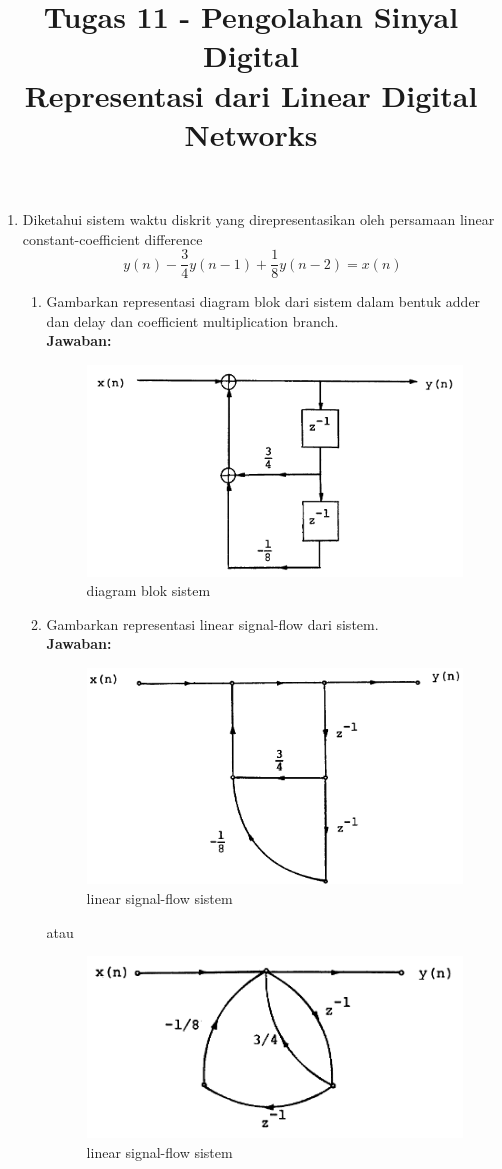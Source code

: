 \documentclass[12pt,a4paper]{article}
\title{Tugas 11 - Pengolahan Sinyal Digital\\
	Representasi dari Linear Digital Networks}
\date{}
\begin{document}
	\maketitle
	\date{}
	\begin{enumerate}
		\item Diketahui sistem waktu diskrit yang direpresentasikan oleh persamaan linear constant-coefficient difference \[ y(n) - \frac{3}{4} y(n-1) + \frac{1}{8} y(n-2) = x(n) \]
		\begin{enumerate}
			\item Gambarkan representasi diagram blok dari sistem dalam bentuk adder dan delay dan coefficient multiplication branch.\\
			\textbf{Jawaban:}\\
			
			\begin{figure}[H]
				\centering
				\includegraphics[width=0.5\linewidth]{img/img01}
				\caption{diagram blok sistem}
				\label{fig:img01}
			\end{figure}
			
			\item Gambarkan representasi linear signal-flow dari sistem.\\
			\textbf{Jawaban:}\\
			\begin{figure}[H]
				\centering
				\includegraphics[width=0.5\linewidth]{img/img02}
				\caption{linear signal-flow sistem}
				\label{fig:img02}
			\end{figure}
			
			atau
			
			\begin{figure}[H]
				\centering
				\includegraphics[width=0.5\linewidth]{img/img03}
				\caption{linear signal-flow sistem}
				\label{fig:img03}
			\end{figure}
			

\end{enumerate}
\end{enumerate}
\end{document}
